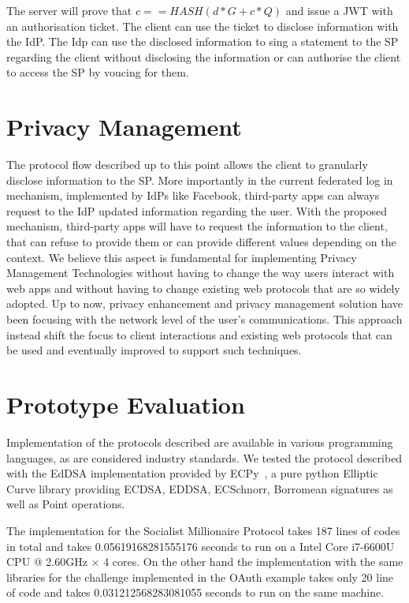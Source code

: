 The server will prove that $c == HASH(d * G + c * Q)$ and issue a JWT with an authorisation ticket.
The client can use the ticket to disclose information with the IdP. The Idp can use the disclosed information to sing a statement to the SP regarding the client without disclosing the information or can authorise the client to access the SP by voucing for them.

\section{Privacy Management}

The protocol flow described up to this point allows the client to granularly disclose information to the SP. More importantly in the current federated log in mechanism, implemented by IdPs like Facebook, third-party apps can always request to the IdP updated information regarding the user. With the proposed mechanism, third-party apps will have to request the information to the client, that can refuse to provide them or can provide different values depending on the context. 
We believe this aspect is fundamental for implementing Privacy Management Technologies without having to change the way users interact with web apps and without having to change existing web protocols that are so widely adopted. Up to now, privacy enhancement and privacy management solution have been focusing with the network level of the user's communications. This approach instead shift the focus to client interactions and existing web protocols that can be used and eventually improved to support such techniques.

\section{Prototype Evaluation}

Implementation of the protocols described are available in various programming languages, as are considered industry standards. We tested the protocol described with the EdDSA implementation provided by ECPy~\cite{ecpy}, a pure python Elliptic Curve library providing ECDSA, EDDSA, ECSchnorr, Borromean signatures as well as Point operations.

The implementation for the Socialist Millionaire Protocol takes 187 lines of codes in total and takes 0.05619168281555176 seconds to run on a Intel Core i7-6600U CPU @ 2.60GHz × 4 cores. On the other hand the implementation with the same libraries for the challenge implemented in the OAuth example takes only 20 line of code and takes 0.031212568283081055 seconds to run on the same machine.

